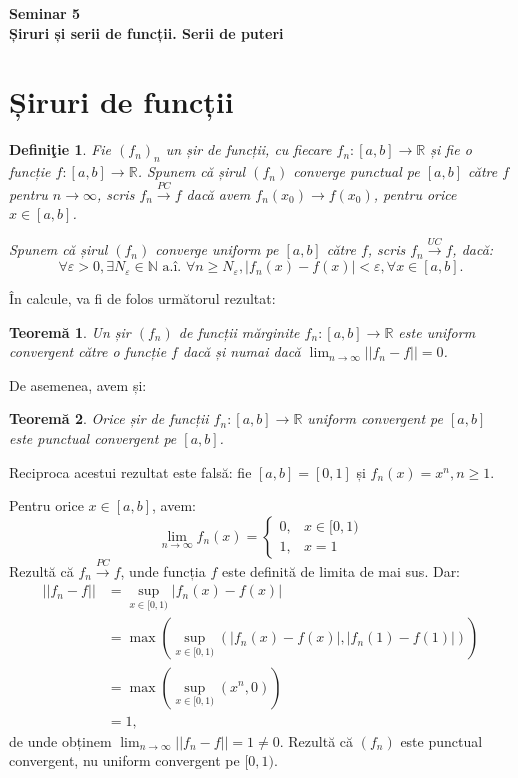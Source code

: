 \documentclass[11pt,a4paper]{article}
\newcommand\ds{\displaystyle}
\newcommand\xrar{\xrightarrow}
\newcommand\ai{\text{ a.\^{i}. }}
\newcommand\NN{\mathbb{N}}
\newcommand\RR{\mathbb{R}}
\theoremstyle{dotless}
\newtheorem{theorem}{Teorem\u{a}}[section]
\theoremstyle{dotlessdr}
\newtheorem{definition}{Defini\c{t}ie}[section]
\begin{document}

\begin{center}
  {\large\textbf{Seminar 5 \\ Șiruri și serii de funcții. Serii de puteri}}
\end{center}

\section{Șiruri de funcții}
\label{sec:siruri-f}

\begin{definition}\label{def:pc-uc}
  Fie $(f_n)_n$ un șir de funcții, cu fiecare $f_n : [a, b] \to \RR$ și fie
  o funcție $f: [a, b] \to \RR$. Spunem că șirul $(f_n)$ \emph{converge punctual}
  pe $[a, b]$ către $f$ pentru $n \to \infty$, scris $f_n \xrar{PC} f$ dacă avem
  $f_n(x_0) \to f(x_0)$, pentru orice $x \in [a, b]$.

  Spunem că șirul $(f_n)$ \emph{converge uniform} pe $[a, b]$ către $f$, scris
  $f_n \xrar{UC} f$, dacă:
  \[
    \forall \varepsilon > 0, \exists N_\varepsilon \in \NN \ai %
    \forall n \geq N_\varepsilon, |f_n(x) - f(x)| < \varepsilon, \forall x \in [a, b].
  \]
\end{definition}

În calcule, va fi de folos următorul rezultat:

\begin{theorem}\label{thm:pc-uc}
  Un șir $(f_n)$ de funcții mărginite $f_n : [a, b] \to \RR$ este uniform convergent
  către o funcție $f$ dacă și numai dacă $\ds\lim_{n \to \infty} ||f_n - f|| = 0$.
\end{theorem}

De asemenea, avem și:
\begin{theorem}\label{thm:pc-uc-implica}
  Orice șir de funcții $f_n : [a, b] \to \RR$ uniform convergent pe $[a, b]$ este
  punctual convergent pe $[a, b]$.
\end{theorem}

Reciproca acestui rezultat este falsă: fie $[a, b] = [0, 1]$ și $f_n(x) = x^n, n \geq 1$.

Pentru orice $x \in [a, b]$, avem:
\[
  \lim_{n \to \infty} f_n(x) =
  \begin{cases}
    0, & x \in [0, 1) \\
    1, & x = 1
  \end{cases}
\]
Rezultă că $f_n \xrar{PC} f$, unde funcția $f$ este definită de limita de mai sus.
Dar:
\begin{align*}
  ||f_n - f|| &= \sup_{x \in [0, 1)} |f_n(x) - f(x)| \\
              &= \max (\sup_{x \in [0, 1)} (|f_n(x) - f(x)|, |f_n(1) - f(1)|)) \\
              &= \max (\sup_{x \in [0, 1)} (x^n, 0)) \\
              &= 1,
\end{align*}
de unde obținem $\ds\lim_{n \to \infty} ||f_n - f|| = 1 \neq 0$. Rezultă că
$(f_n)$ este punctual convergent, nu uniform convergent pe $[0, 1)$.
\end{document}
